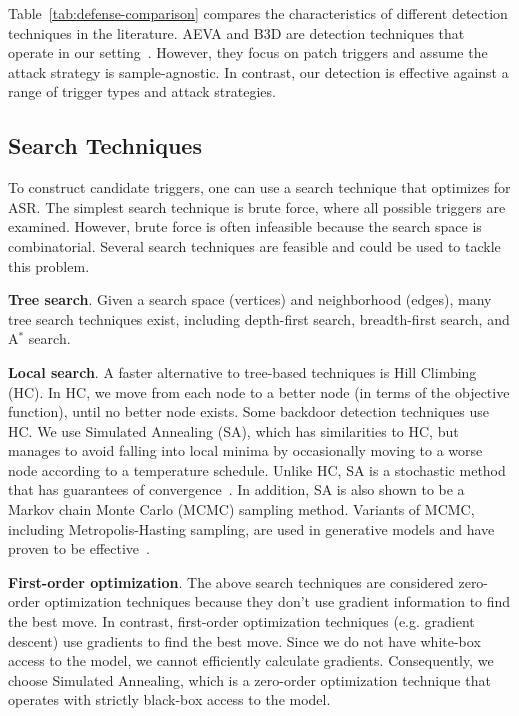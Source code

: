 \documentclass[letterpaper,twocolumn,10pt]{article}
\begin{document}
Table~\ref{tab:defense-comparison} compares the characteristics of different detection techniques in the literature. AEVA and B3D are detection techniques that operate in our setting~\cite{guo2021aeva, dong2021black}. However, they focus on patch triggers and assume the attack strategy is sample-agnostic. In contrast, our detection is effective against a range of trigger types and attack strategies.



\subsection{Search Techniques}


To construct candidate triggers, one can use a search technique that optimizes for ASR. The simplest search technique is brute force, where all possible triggers are examined. However, brute force is often infeasible because the search space is combinatorial. Several search techniques are feasible and could be used to tackle this problem.

\textbf{Tree search}. Given a search space (vertices) and neighborhood (edges), many tree search techniques exist, including depth-first search, breadth-first search, and A$^*$ search.

\textbf{Local search}. A faster alternative to tree-based techniques is Hill Climbing (HC). In HC, we move from each node to a better node (in terms of the objective function), until no better node exists. Some backdoor detection techniques use HC.  We use Simulated Annealing (SA), which has similarities to HC, but manages to avoid falling into local minima by occasionally moving to a worse node according to a temperature schedule. Unlike HC, SA is a stochastic method that has guarantees of convergence~\cite{simulatedann}. In addition, SA is also shown to be a Markov chain Monte Carlo (MCMC) sampling method. Variants of MCMC, including Metropolis-Hasting sampling, are used in generative models and have proven to be effective~\cite{turner2019metropolishastings}.

\textbf{First-order optimization}. The above search techniques are considered zero-order optimization techniques because they don't use gradient information to find the best move. In contrast, first-order optimization techniques (e.g. gradient descent) use gradients to find the best move. Since we do not have white-box access to the model, we cannot efficiently calculate gradients. Consequently, we choose Simulated Annealing, which is a zero-order optimization technique that operates with strictly black-box access to the model.
\end{document}
